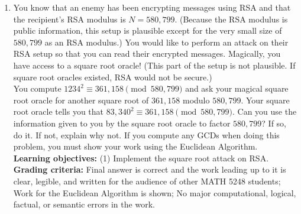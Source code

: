 \documentclass[12pt]{article}
\begin{document}
\begin{enumerate}
\begin{enumerate}
\end{enumerate}
{\bf Learning objectives:} (1) Encrypt messages using RSA. (2) Decrypt messages using RSA. \\
{\bf Grading Criteria:} Final answer is correct and the work leading up to it is clear, legible, and written for the audience of other MATH 5248 students; Work shows understanding of the stated learning objectives. 


\item You know that an enemy has been encrypting messages using RSA and that the recipient's RSA modulus is $N = 580,799$.  (Because the RSA modulus is public information, this setup is plausible except for the very small size of $580,799$ as an RSA modulus.)  You would like to perform an attack on their RSA setup so that you can read their encrypted messages.  Magically, you have access to a square root oracle!  (This part of the setup is not plausible.  If square root oracles existed, RSA would not be secure.)  \\[1em]
You compute $1234^2\equiv 361,158 \pmod{580,799}$ and ask your magical square root oracle for another square root of $361,158 $ modulo $580,799$. Your square root oracle tells you that $83,340^2\equiv 361,158 \pmod{580,799}$.  Can you use the information given to you by the square root oracle to factor $580,799$?  If so, do it.  If not, explain why not.  If you compute any GCDs when doing this problem, you must show your work using the Euclidean Algorithm. \\
{\bf Learning objectives:} (1) Implement the square root attack on RSA.\\
{\bf Grading criteria:} Final answer is correct and the work leading up to it is clear, legible, and written for the audience of other MATH 5248 students; Work for the Euclidean Algorithm is shown; No major computational, logical, factual, or semantic errors in the work.  


\end{enumerate}
\end{document}
